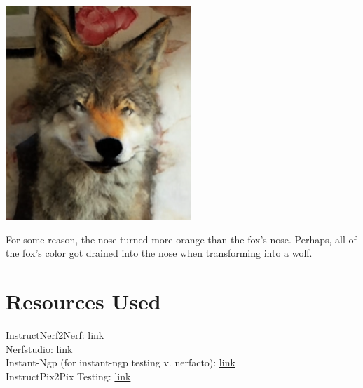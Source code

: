 \documentclass{article}
\begin{document}
\begin{center}
\begin{tcolorbox}
\begin{center}
        \end{center}
    \end{tcolorbox}
    \begin{tcolorbox}[
                      boxsep=0pt,
                      left=0pt,
                      right=0pt,
                      top=2pt,
                      colback=blue!5!white,
                      colframe=blue!75!black,
                      center title,
                      autowidth title=transform the fox into a wolf
                      ]
        \begin{center}
            \includegraphics[scale=0.4]{images/wolfin2n.PNG}
        \end{center}
    \end{tcolorbox}
    For some reason, the nose turned more orange than the fox's nose. Perhaps, all of the fox's color got drained into the nose when transforming into a wolf.
\end{center}

\section{Resources Used}

InstructNerf2Nerf: \href{https://github.com/ayaanzhaque/instruct-nerf2nerf/tree/main#tips}{link}\\
Nerfstudio: \href{https://docs.nerf.studio}{link}\\
Instant-Ngp (for instant-ngp testing v. nerfacto): \href{https://github.com/NVlabs/instant-ngp}{link}\\
InstructPix2Pix Testing: \href{https://huggingface.co/spaces/timbrooks/instruct-pix2pix}{link}\\
\end{document}
